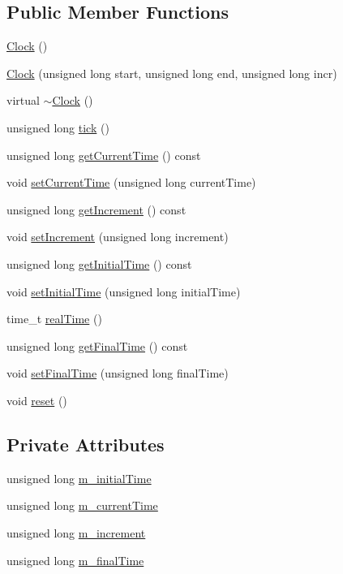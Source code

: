 \subsection*{Public Member Functions}
\begin{DoxyCompactItemize}
\item 
\hyperlink{class_clock_adbc370eb6b5f8d01645cf440188160a8}{Clock} ()
\item 
\hyperlink{class_clock_a89a798e152f8eba2f6eb80ec92b26ece}{Clock} (unsigned long start, unsigned long end, unsigned long incr)
\item 
virtual \hyperlink{class_clock_ac1ddbca9092c61e98668473209f36b19}{$\sim$\+Clock} ()
\item 
unsigned long \hyperlink{class_clock_ab7c857c5b43cf98d991435ba9ce46b2c}{tick} ()
\item 
unsigned long \hyperlink{class_clock_a17b19c062d1f0344f37b57cc2dfdaa14}{get\+Current\+Time} () const
\item 
void \hyperlink{class_clock_a7046e8733ab749d3c24b3c61bd108d6c}{set\+Current\+Time} (unsigned long current\+Time)
\item 
unsigned long \hyperlink{class_clock_a804626d5455f4a2a73321f84ed7a9819}{get\+Increment} () const
\item 
void \hyperlink{class_clock_a1ae60dca4e41f6e27d6104ec618c02f1}{set\+Increment} (unsigned long increment)
\item 
unsigned long \hyperlink{class_clock_a9792f62fed3c320abecc5c455b13a804}{get\+Initial\+Time} () const
\item 
void \hyperlink{class_clock_abe7fb8f715d0dcae08e52b2b7aed7db2}{set\+Initial\+Time} (unsigned long initial\+Time)
\item 
time\+\_\+t \hyperlink{class_clock_a29512d39298cafed334d0c01da70ea7b}{real\+Time} ()
\item 
unsigned long \hyperlink{class_clock_a0b9ef0b9272d6555bb0fdca4978c705d}{get\+Final\+Time} () const
\item 
void \hyperlink{class_clock_a4780f83b55bc2539cd7069cfc4f06d99}{set\+Final\+Time} (unsigned long final\+Time)
\item 
void \hyperlink{class_clock_a0ab5423b0a997aa13d7b6131c46d1358}{reset} ()
\end{DoxyCompactItemize}
\subsection*{Private Attributes}
\begin{DoxyCompactItemize}
\item 
unsigned long \hyperlink{class_clock_a71afbea0f41f612e36d45ee2bb79ff0e}{m\+\_\+initial\+Time}
\item 
unsigned long \hyperlink{class_clock_a73bf4edfc8f0fe2548ef6956f68b678e}{m\+\_\+current\+Time}
\item 
unsigned long \hyperlink{class_clock_a2f940f0a30d58d1f7f36d0296463b9aa}{m\+\_\+increment}
\item 
unsigned long \hyperlink{class_clock_a5c473d84c1051d946ab5565060902840}{m\+\_\+final\+Time}
\end{DoxyCompactItemize}


